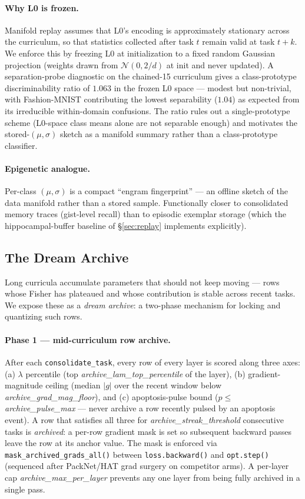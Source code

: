 \documentclass[11pt]{article}
\begin{document}
\paragraph{Why L0 is frozen.}
Manifold replay assumes that L0's encoding is approximately stationary
across the curriculum, so that statistics collected after task $t$ remain
valid at task $t + k$. We enforce this by freezing L0 at initialization to
a fixed random Gaussian projection (weights drawn from
$\mathcal{N}(0, 2/d)$ at init and never updated). A separation-probe
diagnostic on the chained-15 curriculum gives a class-prototype
discriminability ratio of $1.063$ in the frozen L0 space --- modest but
non-trivial, with Fashion-MNIST contributing the lowest separability
($1.04$) as expected from its irreducible within-domain confusions. The
ratio rules out a single-prototype scheme (L0-space class means alone are
not separable enough) and motivates the stored-$(\mu, \sigma)$ sketch as a
manifold summary rather than a class-prototype classifier.

\paragraph{Epigenetic analogue.}
Per-class $(\mu, \sigma)$ is a compact ``engram fingerprint'' --- an
offline sketch of the data manifold rather than a stored sample.
Functionally closer to consolidated memory traces (gist-level recall) than
to episodic exemplar storage (which the hippocampal-buffer baseline of
\S\ref{sec:replay} implements explicitly).

\subsection{The Dream Archive}
\label{sec:archive}

Long curricula accumulate parameters that should not keep moving --- rows
whose Fisher has plateaued and whose contribution is stable across recent
tasks. We expose these as a \emph{dream archive}: a two-phase mechanism
for locking and quantizing such rows.

\paragraph{Phase 1 --- mid-curriculum row archive.}
After each \texttt{consolidate\_task}, every row of every layer is scored
along three axes: (a) $\lambda$ percentile (top
\textit{archive\_lam\_top\_percentile} of the layer), (b)
gradient-magnitude ceiling (median $|g|$ over the recent window below
\textit{archive\_grad\_mag\_floor}), and (c) apoptosis-pulse bound
($p \leq$ \textit{archive\_pulse\_max} --- never archive a row recently
pulsed by an apoptosis event). A row that satisfies all three for
\textit{archive\_streak\_threshold} consecutive tasks is \emph{archived}:
a per-row gradient mask is set so subsequent backward passes leave the row
at its anchor value. The mask is enforced via
\texttt{mask\_archived\_grads\_all()} between \texttt{loss.backward()} and
\texttt{opt.step()} (sequenced after PackNet/HAT grad surgery on
competitor arms). A per-layer cap \textit{archive\_max\_per\_layer}
prevents any one layer from being fully archived in a single pass.
\end{document}
